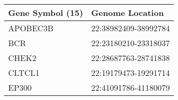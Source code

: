 \begin{tabular}{ll}
\toprule
Gene Symbol (15) &      Genome Location \\
\midrule
        APOBEC3B & 22:38982409-38992784 \\
             BCR & 22:23180210-23318037 \\
           CHEK2 & 22:28687763-28741838 \\
          CLTCL1 & 22:19179473-19291714 \\
           EP300 & 22:41091786-41180079 \\
\bottomrule
\end{tabular}

